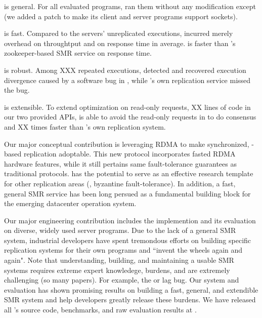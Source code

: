 \begin{tightenum}
\item \xxx is general. For all evaluated programs, \xxx ran them without any 
modification except \calvin (we added a \nlinescalvin patch to make its client 
and server programs support sockets).

\item \xxx is fast. Compared to the \nprog servers' unreplicated executions, 
\xxx incurred merely \tputoverhead overhead on throughtput and \latencyoverhead 
on response time in average. \xxx is \fasterthanzookeeper faster than \calvin's 
zookeeper-based SMR service on response time.

\item \xxx is robust. Among XXX repeated executions, \xxx detected and 
recovered execution divergence caused by a software bug in \redis, while 
\redis's own replication service missed the bug.

\item \xxx is extensible. To extend optimization on read-only requests, XX 
lines of code in our two provided APIs, \xxx is able to avoid the read-only 
requests in \redis to do consensus and XX times faster than \redis's own 
replication system. 

\end{tightenum}  

Our major conceptual contribution is leveraging RDMA to make synchronized, 
\paxos-based replication adoptable. This new protocol incorporates fasted RDMA 
hardware features, while it still pertains same fault-tolerance guarantees as 
traditional \paxos protocols. \xxx has the potential to serve as an effective 
research template for other replication areas (\eg, byzantine fault-tolerance). 
In addition, a fast, general SMR service has been long persued as a fundamental 
building block for the emerging datacenter operation system.

Our major engineering contribution includes the \xxx implemention and its 
evaluation on \nprog diverse, widely used server programs. Due to the lack of a 
general SMR system, industrial developers have spent tremondous efforts on 
building specific replication systems for their own programs and ``invent the 
wheels again and again". Note that understanding, building, and maintaining a 
usable SMR systems requires extreme expert knowledege, burdens, and are 
extremely challenging (so many \paxos papers). For example, the \redis or 
\memcached lag bug. Our \xxx system and evaluation has shown promising results 
on building a fast, general, and extendible SMR system and help developers 
greatly release these burdens. We have released all \xxx's source code, 
benchmarks, and raw evaluation results at \github.

